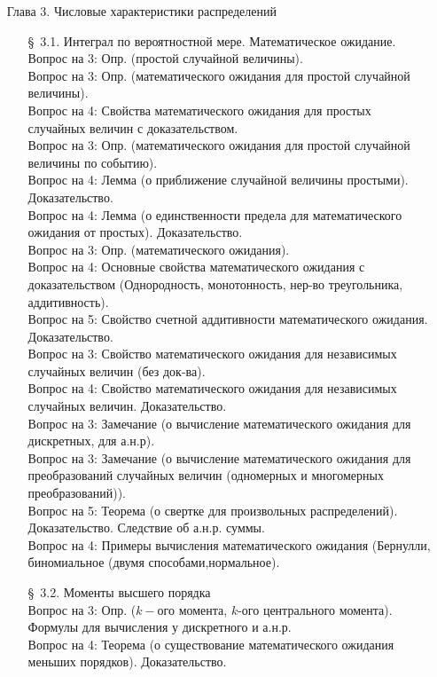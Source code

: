 \documentclass[10pt]{amsart}
\begin{document}
\begin{enumerate}
    
\item[Глава 3.] Числовые характеристики распределений \\
    
\begin{enumerate}
\item[\S\, 3.1.] Интеграл по вероятностной мере. Математическое ожидание. \\
Вопрос на 3: Опр. (простой случайной величины). \\
Вопрос на 3: Опр. (математического ожидания для простой случайной величины). \\
Вопрос на 4: Свойства математического ожидания для  простых случайных величин с доказательством. \\
Вопрос на 3: Опр. (математического ожидания для простой случайной величины по событию). \\
Вопрос на 4: Лемма (о приближение случайной величины простыми). Доказательство. \\
Вопрос на 4: Лемма (о единственности предела для математического ожидания от простых). Доказательство. \\ 
Вопрос на 3: Опр. (математического ожидания). \\
Вопрос на 4: Основные свойства математического ожидания с доказательством (Однородность, монотонность, нер-во треугольника, аддитивность). \\
Вопрос на 5:  Свойство счетной аддитивности математического ожидания. Доказательство. \\
Вопрос на 3: Свойство  математического ожидания для независимых случайных величин (без док-ва). \\
Вопрос на 4: Свойство  математического ожидания для независимых случайных величин. Доказательство. \\
Вопрос на 3: Замечание (о вычисление  математического ожидания для дискретных, для а.н.р). \\
Вопрос на 3: Замечание (о вычисление  математического ожидания для преобразований случайных величин (одномерных и многомерных преобразований)). \\
Вопрос на 5: Теорема (о свертке для произвольных распределений). Доказательство. Следствие об а.н.р. суммы. \\ 
Вопрос на 4: Примеры вычисления математического ожидания (Бернулли, биномиальное (двумя способами,нормальное). \\


\item[\S\, 3.2.] Моменты высшего порядка \\
Вопрос на 3: Опр. ($k-$ого момента, $k$-ого центрального момента). Формулы для вычисления у дискретного и а.н.р. \\
Вопрос на 4: Теорема (о существование математического ожидания меньших порядков). Доказательство. \\



\end{enumerate}
\end{enumerate}
\end{document}
